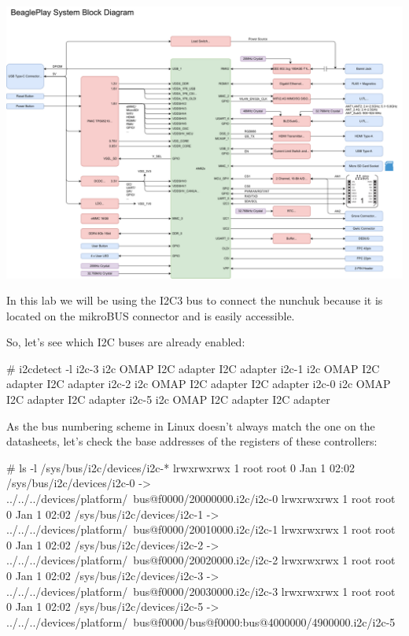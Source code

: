 \includegraphics[width=\textwidth]{labs/sysdev-accessing-hardware-beagleplay/System-Block-Diagram.png}

In this lab we will be using the I2C3 bus to connect the nunchuk because it is
located on the mikroBUS connector and is easily accessible.

So, let's see which I2C buses are already enabled:

\begin{bashinput}
# i2cdetect -l
i2c-3 i2c OMAP I2C adapter I2C adapter
i2c-1 i2c OMAP I2C adapter I2C adapter
i2c-2 i2c OMAP I2C adapter I2C adapter
i2c-0 i2c OMAP I2C adapter I2C adapter
i2c-5 i2c OMAP I2C adapter I2C adapter
\end{bashinput}

As the bus numbering scheme in Linux doesn't always match the one
on the datasheets, let's check the base addresses of the registers
of these controllers:

\begin{bashinput}
# ls -l /sys/bus/i2c/devices/i2c-*
lrwxrwxrwx 1 root root 0 Jan 1 02:02 /sys/bus/i2c/devices/i2c-0 -> ../../../devices/platform/\
bus@f0000/20000000.i2c/i2c-0
lrwxrwxrwx 1 root root 0 Jan 1 02:02 /sys/bus/i2c/devices/i2c-1 -> ../../../devices/platform/\
bus@f0000/20010000.i2c/i2c-1
lrwxrwxrwx 1 root root 0 Jan 1 02:02 /sys/bus/i2c/devices/i2c-2 -> ../../../devices/platform/\
bus@f0000/20020000.i2c/i2c-2
lrwxrwxrwx 1 root root 0 Jan 1 02:02 /sys/bus/i2c/devices/i2c-3 -> ../../../devices/platform/\
bus@f0000/20030000.i2c/i2c-3
lrwxrwxrwx 1 root root 0 Jan 1 02:02 /sys/bus/i2c/devices/i2c-5 -> ../../../devices/platform/\
bus@f0000/bus@f0000:bus@4000000/4900000.i2c/i2c-5
\end{bashinput}


